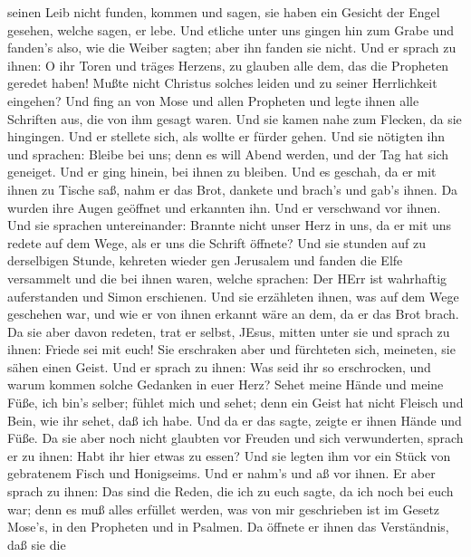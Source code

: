 seinen Leib nicht funden, kommen und sagen, sie haben ein Gesicht der
Engel gesehen, welche sagen, er lebe.  Und etliche unter
uns gingen hin zum Grabe und fanden's also, wie die Weiber sagten; aber
ihn fanden sie nicht.  Und er sprach zu ihnen: O ihr Toren
und träges Herzens, zu glauben alle dem, das die Propheten geredet
haben!  Mußte nicht Christus solches leiden und zu seiner
Herrlichkeit eingehen?  Und fing an von Mose und allen
Propheten und legte ihnen alle Schriften aus, die von ihm gesagt waren.
 Und sie kamen nahe zum Flecken, da sie hingingen. Und er
stellete sich, als wollte er fürder gehen.  Und sie
nötigten ihn und sprachen: Bleibe bei uns; denn es will Abend werden,
und der Tag hat sich geneiget. Und er ging hinein, bei ihnen zu bleiben.
 Und es geschah, da er mit ihnen zu Tische saß, nahm er das
Brot, dankete und brach's und gab's ihnen.  Da wurden ihre
Augen geöffnet und erkannten ihn. Und er verschwand vor ihnen.
 Und sie sprachen untereinander: Brannte nicht unser Herz
in uns, da er mit uns redete auf dem Wege, als er uns die Schrift
öffnete?  Und sie stunden auf zu derselbigen Stunde,
kehreten wieder gen Jerusalem und fanden die Elfe versammelt und die bei
ihnen waren,  welche sprachen: Der HErr ist wahrhaftig
auferstanden und Simon erschienen.  Und sie erzähleten
ihnen, was auf dem Wege geschehen war, und wie er von ihnen erkannt wäre
an dem, da er das Brot brach.  Da sie aber davon redeten,
trat er selbst, JEsus, mitten unter sie und sprach zu ihnen: Friede sei
mit euch!  Sie erschraken aber und fürchteten sich,
meineten, sie sähen einen Geist.  Und er sprach zu ihnen:
Was seid ihr so erschrocken, und warum kommen solche Gedanken in euer
Herz?  Sehet meine Hände und meine Füße, ich bin's selber;
fühlet mich und sehet; denn ein Geist hat nicht Fleisch und Bein, wie
ihr sehet, daß ich habe.  Und da er das sagte, zeigte er
ihnen Hände und Füße.  Da sie aber noch nicht glaubten vor
Freuden und sich verwunderten, sprach er zu ihnen: Habt ihr hier etwas
zu essen?  Und sie legten ihm vor ein Stück von gebratenem
Fisch und Honigseims.  Und er nahm's und aß vor ihnen.
 Er aber sprach zu ihnen: Das sind die Reden, die ich zu
euch sagte, da ich noch bei euch war; denn es muß alles erfüllet werden,
was von mir geschrieben ist im Gesetz Mose's, in den Propheten und in
Psalmen.  Da öffnete er ihnen das Verständnis, daß sie die
